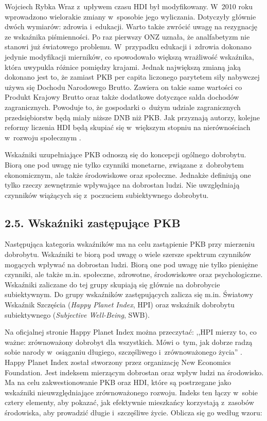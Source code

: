 \begin{artplenv}{Wojciech Rybka}
Wraz z~upływem czasu HDI był modyfikowany. W~2010 roku wprowadzono wielorakie zmiany w~sposobie jego wyliczania.
Dotyczyły głównie dwóch wymiarów: zdrowia i~edukacji. Warto także zwrócić uwagę na rezygnację ze wskaźnika
piśmienności. Po raz pierwszy ONZ uznała, że analfabetyzm nie stanowi już światowego problemu. W~przypadku
edukacji i~zdrowia dokonano jedynie modyfikacji mierników, co spowodowało większą wrażliwość wskaźnika, która uwypukla różnice
pomiędzy krajami. Jednak największą zmianą jaką dokonano jest to, że zamiast PKB per capita liczonego parytetem siły
nabywczej używa się Dochodu Narodowego Brutto. Zawiera on takie same wartości co Produkt Krajowy Brutto oraz także
dodatkowe dotyczące salda dochodów zagranicznych. Powoduje to, że gospodarki o~dużym udziale zagranicznych
przedsiębiorstw będą miały niższe DNB niż PKB. Jak przyznają autorzy, kolejne reformy liczenia HDI będą skupiać
się w~większym stopniu na nierównościach w~rozwoju społecznym
\parencite{antczak_nowe_2012}.

\enlargethispage{1\baselineskip}

Wskaźniki uzupełniające PKB odnoszą się do koncepcji ogólnego dobrobytu. Biorą one pod uwagę nie tylko czynniki
monetarne, związane z~dobrobytem ekonomicznym, ale także środowiskowe oraz społeczne. Jednakże definiują one tylko
rzeczy zewnętrznie wpływające na dobrostan ludzi. Nie uwzględniają czynników wiążących się z~poczuciem subiektywnego
dobrobytu.

\subsection{2.5. Wskaźniki zastępujące PKB}
Następująca kategoria wskaźników ma na celu zastąpienie PKB przy mierzeniu dobrobytu. Wskaźniki te biorą pod uwagę o
wiele szersze spektrum czynników mogących wpływać na dobrostan ludzi. Biorą one pod uwagę nie tylko pieniężne czynniki,
ale także m.in. społeczne, zdrowotne, środowiskowe oraz psychologiczne. Wskaźniki zaliczane do tej grupy skupiają się
głównie na dobrobycie subiektywnym. Do grupy wskaźników zastępujących zalicza się m.in. Światowy Wskaźnik Szczęścia
(\textit{Happy Planet Index}, HPI) oraz wskaźnik dobrobytu subiektywnego (\textit{Subjective Well-Being}, SWB).

Na oficjalnej stronie Happy Planet Index można przeczytać: ,,HPI mierzy to, co ważne: zrównoważony dobrobyt dla
wszystkich. Mówi o~tym, jak dobrze radzą sobie narody w~osiąganiu długiego, szczęśliwego i~zrównoważonego życia''
\parencite{noauthor_about_2019}.
Happy Planet Index został stworzony przez organizację New Economics
Foundation. Jest indeksem mierzącym dobrostan oraz wpływ ludzi na środowisko. Ma na celu zakwestionowanie PKB oraz HDI,
które są postrzegane jako wskaźniki nieuwzględniające zrównoważonego rozwoju. Indeks ten łączy w~sobie cztery elementy,
aby pokazać, jak efektywnie mieszkańcy korzystają z~zasobów środowiska, aby prowadzić długie i~szczęśliwe życie. Oblicza
się go według wzoru:


\end{artplenv}
